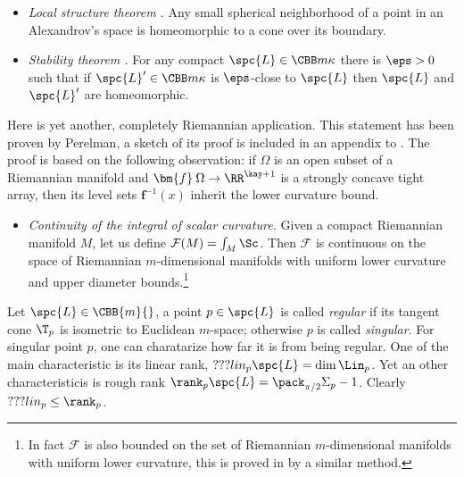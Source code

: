\begin{itemize}

\item{\it Local structure theorem \cite{perelman:morse}.}
Any small spherical neighborhood of a point in an Alexandrov's space is homeomorphic to a cone over its boundary.

\item{\it Stability theorem \cite{perelman:spaces2}.} 
For any compact $\spc{L}\in \CBB m\kappa$ there is $\eps>0$ such that if $\spc{L}'\in \CBB m\kappa$ is $\eps$-close to $\spc{L}$ then $\spc{L}$ and $\spc{L}'$ are homeomorphic.

\end{itemize}










Here is yet another, completely Riemannian application. This statement has been
proven by Perelman, a sketch of its proof is included in an appendix to
\cite{petrunin:PL}.
The proof is based on the following observation: if $\Omega$ is an open subset of a Riemannian manifold and  $\bm{f}\:\Omega\to\RR^{\kay+1}$ is a strongly concave tight array, then its level sets $\bm{f}^{-1}(x)$ inherit the lower curvature bound. 
\begin{itemize}
\item \emph{Continuity of the integral of scalar curvature.} 
Given  a compact Riemannian manifold $M$, let us define $\mathcal F(M)=\int_M\Sc$. 
Then $\mathcal F$ is continuous on the space of Riemannian
$m$-dimensional manifolds with uniform lower curvature and upper diameter
bounds.\footnote{In fact $\mathcal F$ is also bounded on the set of Riemannian
$m$-dimensional manifolds with uniform lower curvature, this is proved in
\cite{petrunin:scalar} by a similar method.}
\end{itemize}














Let $\spc{L}\in\CBB{m}{}$, a point $p\in \spc{L}$ is called \emph{regular} if its tangent cone $\T_p$ is isometric to Euclidean $m$-space;
otherwise $p$ is called \emph{singular}.
For singular point $p$, one can charatarize how far it is from being regular.
One of the main characteristic is its linear rank, 
$???lin_p\spc{L}=\dim\Lin_p$.
Yet an other characteristicis is rough rank $\rank_p\spc{L}=\pack_{\pi/2}\Sigma_p-1$.
Clearly $???lin_p\le \rank_p$.















